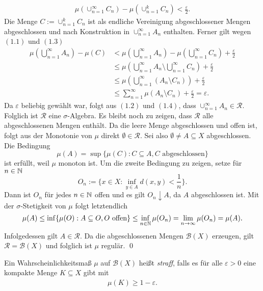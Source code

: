 \begin{proof*}
\begin{align}
    \mu(\cup_{n=1}^{\infty}C_n) - \mu(\cup_{n=1}^kC_n) < \frac{\varepsilon}{2}.
    \end{align}
    Die Menge $C:= \cup_{n=1}^kC_n$ ist als endliche Vereinigung abgeschlossener Mengen abgeschlossen und nach Konstruktion in $\cup_{n=1}^{\infty}A_n$ enthalten. Ferner gilt wegen $(1.1)$ und $(1.3)$
    \begin{align}
        \mu(\bigcup_{n=1}^{\infty}A_n) - \mu(C) &< \mu(\bigcup_{n=1}^{\infty}A_n) - \mu(\bigcup_{n=1}^{\infty}C_n) + \frac{\varepsilon}{2} \nonumber \\\
                                                &\leq \mu(\bigcup_{n=1}^{\infty}A_n \setminus \bigcup_{n=1}^{\infty}C_n)  + \frac{\varepsilon}{2} \nonumber \\\
                                                &\leq \mu(\bigcup_{n=1}^{\infty}(A_n \setminus C_n)) + \frac{\varepsilon}{2} \nonumber \\\
                                                &\leq \sum_{n=1}^{\infty}\mu(A_n \setminus C_n) + \frac{\varepsilon}{2} = \varepsilon. 
    \end{align}
    Da $\varepsilon$ beliebig gewählt war, folgt aus $(1.2)$ und $(1.4)$, dass $\cup_{n=1}^{\infty}A_n \in \mathcal{R}$. Folglich ist $\mathcal{R}$ eine $\sigma$-Algebra. 
    Es bleibt noch zu zeigen, dass $\mathcal{R}$ alle abgeschlossenen Mengen enthält. Da die leere Menge abgeschlossen und offen ist, folgt aus der Monotonie von $\mu$ direkt $\emptyset \in \mathcal{R}$. 
    Sei also \mbox{$\emptyset \neq A \subseteq X$} abgeschlossen. Die Bedingung 
    $$
        \mu(A) = \sup\{\mu(C): C \subseteq A, C\text{ abgeschlossen}\}
    $$
    ist erfüllt, weil $\mu$ monoton ist. Um die zweite Bedingung zu zeigen, setze für $n \in \mathbb{N}$
    $$
        O_n := \big\{x \in X: \inf_{y \in  A}d(x,y) < \frac{1}{n}\big\}.
    $$
    Dann ist $O_n$ für jedes $n \in \mathbb{N}$ offen und es gilt $O_n \downarrow A$, da $A$ abgeschlossen ist. 
    Mit der $\sigma$-Stetigkeit von $\mu$ folgt letztendlich 
    $$
        \mu(A) \leq \inf\{\mu(O): A \subseteq O, O \text{ offen}\} \leq \inf_{n \in \mathbb{N}}\mu(O_n) = \lim_{n \to \infty}\mu(O_n) = \mu(A). 
    $$
    Infolgedessen gilt $A \in \mathcal{R}$. Da die abgeschlossenen Mengen $\mathcal{B}(X)$ erzeugen, gilt $\mathcal{R} = \mathcal{B}(X)$ und folglich ist $\mu$ regulär. \qed
\end{proof*}
\begin{mydef}
    Ein Wahrscheinlichkeitsmaß $\mu$ auf $\mathcal{B}(X)$ heißt \textit{straff}, falls es für alle $\varepsilon > 0$ eine kompakte Menge $K \subseteq X$ gibt mit 
    \begin{align*}
        \mu(K) \geq 1 - \varepsilon. 
    \end{align*}

\end{mydef}

